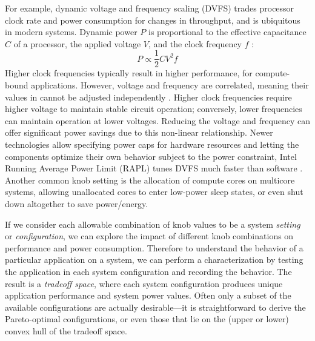 For example, dynamic voltage and frequency scaling (DVFS) trades processor clock rate and power consumption for changes in throughput, and is ubiquitous in modern systems.
Dynamic power $P$ is proportional to the effective capacitance $C$ of a processor, the applied voltage $V$, and the clock frequency $f$ \cite{Hennessy:2003:CAQ:861856}:
\begin{equation}
P \propto \frac{1}{2}CV^2f
\label{eqn:bg-power}
\end{equation}
Higher clock frequencies typically result in higher performance, \eg for compute-bound applications.
However, voltage and frequency are correlated, meaning their values in  cannot be adjusted independently \cite{LeSueur2010}.
Higher clock frequencies require higher voltage to maintain stable circuit operation; conversely, lower frequencies can maintain operation at lower voltages.
Reducing the voltage and frequency can offer significant power savings due to this non-linear relationship.
Newer technologies allow specifying power caps for hardware resources and letting the components optimize their own behavior subject to the power constraint, \eg Intel Running Average Power Limit (RAPL) tunes DVFS much faster than software \cite{RAPL}.
Another common knob setting is the allocation of compute cores on multicore systems, allowing unallocated cores to enter low-power sleep states, or even shut down altogether to save power/energy.

If we consider each allowable combination of knob values to be a system \emph{setting} or \emph{configuration}, we can explore the impact of different knob combinations on performance and power consumption.
Therefore to understand the behavior of a particular application on a system, we can perform a characterization by testing the application in each system configuration and recording the behavior.
The result is a \emph{tradeoff space}, where each system configuration produces unique application performance and system power values.
Often only a subset of the available configurations are actually desirable---it is straightforward to derive the Pareto-optimal configurations, or even those that lie on the (upper or lower) convex hull of the tradeoff space.

